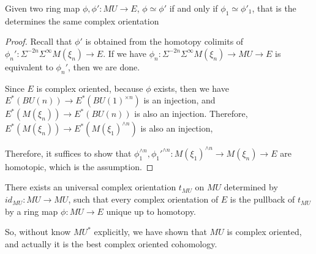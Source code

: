 \begin{theorem}
    Given two ring map $\phi,\phi': MU\to E$, $\phi\simeq \phi'$ if and only if $\phi_1\simeq \phi'_1$, that is the determines the same complex orientation
\end{theorem}
\begin{proof}
    Recall that $\phi'$ is obtained from the homotopy colimits of $\phi_n':\Sigma^{-2n}\Sigma^\infty M(\xi_n)\to E$. If we have $\phi_n:\Sigma^{-2n}\Sigma^\infty M(\xi_n)\to MU \to E$ is equivalent to $\phi_n'$, then we are done.

   Since $E$ is complex oriented, because $\phi$ exists, then we have $E^*(BU(n))\to E^*(BU(1)^{\times n})$ is an injection, and $E^*(M(\xi_n))\to E^*(BU(n))$ is also an injection. Therefore, $E^*(M(\xi_n))\to E^*(M(\xi_1)^{\wedge n})$ is also an injection,
   \begin{center}
   \end{center}
   Therefore, it suffices to show that $\phi_1^{\wedge n},\phi_1'^{\wedge n}:M(\xi_1)^{\wedge n}\to M(\xi_n)\to E$ are homotopic, which is the assumption.
\end{proof}

\begin{corollary}
    There exists an universal complex orientation $t_{MU}$ on $MU$ determined by $id_{MU}:MU\to MU$, such that every complex orientation of $E$ is the pullback of $t_{MU}$  by a ring map $\phi: MU\to E$ unique up to homotopy.
\end{corollary}

So, without know $MU^*$ explicitly, we have shown that $MU$ is complex oriented, and actually it is the best complex oriented cohomology.